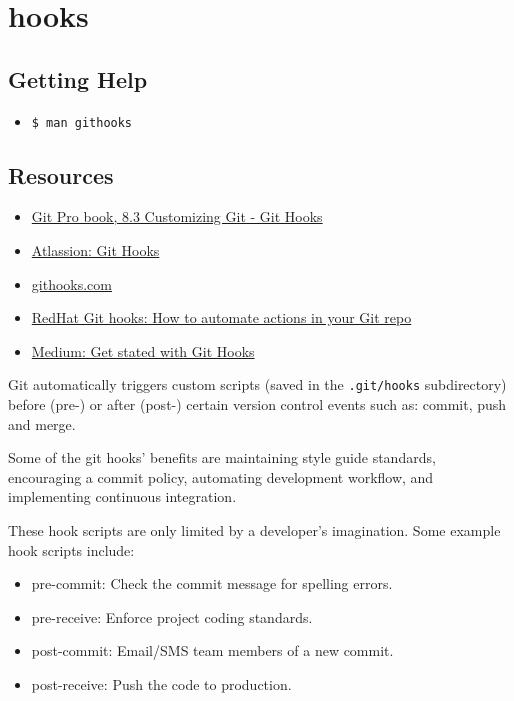 \section{hooks}
\subsection{Getting Help}%
\begin{itemize}
  \item \texttt{\$ man githooks}
\end{itemize}

\subsection{Resources}%
\begin{itemize}
  \item \href{https://git-scm.com/book/en/v2/Customizing-Git-Git-Hooks}{Git Pro book, 8.3 Customizing Git - Git Hooks} 
  \item \href{https://www.atlassian.com/git/tutorials/git-hooks}{Atlassion: Git Hooks} 
  \item \href{https://githooks.com/}{githooks.com} 
  \item \href{https://www.redhat.com/sysadmin/git-hooks}{RedHat Git hooks: How to automate actions in your Git repo}
  \item \href{https://medium.com/@f3igao/get-started-with-git-hooks-5a489725c639}{Medium: Get stated with Git Hooks} 
\end{itemize}
Git automatically triggers custom scripts (saved in the \texttt{.git/hooks} subdirectory) before (pre-) or after (post-) certain version control events such as: commit, push and merge.

Some of the git hooks' benefits are maintaining style guide standards, encouraging a commit policy, automating development workflow, and implementing continuous integration.

These hook scripts are only limited by a developer's imagination. Some example hook scripts include:
\begin{itemize}
  \item    pre-commit: Check the commit message for spelling errors.
  \item    pre-receive: Enforce project coding standards.
  \item    post-commit: Email/SMS team members of a new commit.
  \item    post-receive: Push the code to production.
\end{itemize}


